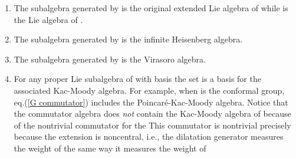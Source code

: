 \documentclass[a4paper,12pt]{article}
\begin{document}
\begin{enumerate}
\item  The subalgebra generated by \coordHE{} is the original extended Lie algebra of \coordHE{} while \coordHE{} is the Lie algebra of \coordHE{}.

\item  The subalgebra generated by \coordHE{} is the infinite Heisenberg
algebra.

\item  The subalgebra generated by \coordHE{} is the Virasoro algebra.

\item  For any proper Lie subalgebra of \coordHE{} with basis \coordHE{} the set \coordHE{} is a
basis for the associated Kac-Moody algebra. For example, when \coordHE{}
is the conformal group, eq.(\ref{G commutator}) includes the
Poincar\'{e}-Kac-Moody algebra. Notice that the commutator algebra does 
\textit{not} contain the Kac-Moody algebra of \coordHE{} because of the
nontrivial commutator for the \coordHE{} This commutator is nontrivial
precisely because the extension is noncentral, i.e., the dilatation
generator \coordHE{} measures the weight of \coordHE{} the same way it measures the
weight of \coordHE{}
\end{enumerate}

\smallskip
\end{document}
